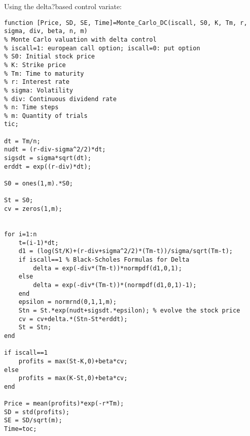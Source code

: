 \documentclass{article}
\begin{document}
Using the delta?based control variate:
\begin{verbatim}
function [Price, SD, SE, Time]=Monte_Carlo_DC(iscall, S0, K, Tm, r, sigma, div, beta, n, m)
% Monte Carlo valuation with delta control
% iscall=1: european call option; iscall=0: put option
% S0: Initial stock price
% K: Strike price
% Tm: Time to maturity
% r: Interest rate
% sigma: Volatility
% div: Continuous dividend rate
% n: Time steps
% m: Quantity of trials
tic;

dt = Tm/n;
nudt = (r-div-sigma^2/2)*dt;
sigsdt = sigma*sqrt(dt);
erddt = exp((r-div)*dt);

S0 = ones(1,m).*S0;

St = S0;
cv = zeros(1,m);


for i=1:n
    t=(i-1)*dt;
    d1 = (log(St/K)+(r-div+sigma^2/2)*(Tm-t))/sigma/sqrt(Tm-t);
    if iscall==1 % Black-Scholes Formulas for Delta
        delta = exp(-div*(Tm-t))*normpdf(d1,0,1);
    else
        delta = exp(-div*(Tm-t))*(normpdf(d1,0,1)-1);
    end
    epsilon = normrnd(0,1,1,m);
    Stn = St.*exp(nudt+sigsdt.*epsilon); % evolve the stock price
    cv = cv+delta.*(Stn-St*erddt);
    St = Stn;
end

if iscall==1
    profits = max(St-K,0)+beta*cv;
else
    profits = max(K-St,0)+beta*cv;
end

Price = mean(profits)*exp(-r*Tm);
SD = std(profits);
SE = SD/sqrt(m);
Time=toc;
\end{verbatim}
\end{document}
